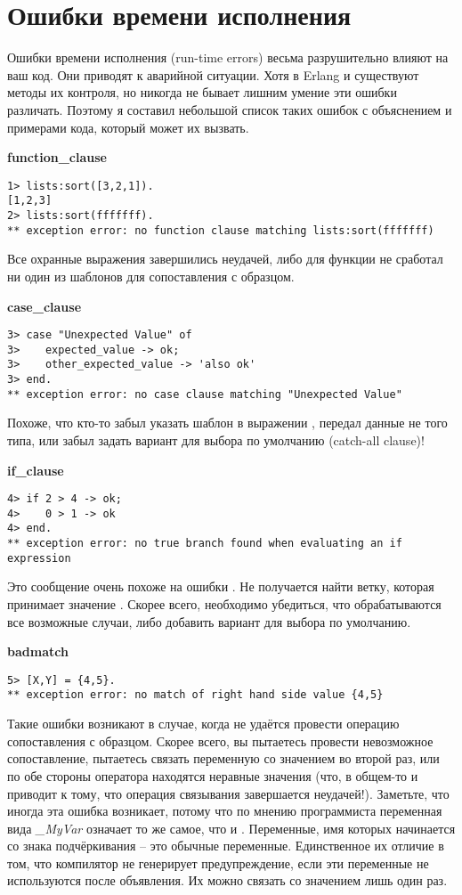 \section{Ошибки времени исполнения}
\label{run-time-errors}
Ошибки времени исполнения (run\--time errors) весьма разрушительно влияют на ваш код. Они приводят к аварийной ситуации.
Хотя в Erlang и существуют методы их контроля, но никогда не бывает лишним умение эти ошибки различать.
Поэтому я составил небольшой список таких ошибок с объяснением и примерами кода, который может их вызвать.

\textbf{function\_clause}
\begin{lstlisting}[style=erlang]
1> lists:sort([3,2,1]).
[1,2,3]
2> lists:sort(fffffff).
** exception error: no function clause matching lists:sort(fffffff)
\end{lstlisting}

Все охранные выражения завершились неудачей, либо для функции не сработал ни один из шаблонов для сопоставления с образцом.
\blankline

\textbf{case\_clause}
\begin{lstlisting}[style=erlang]
3> case "Unexpected Value" of
3>    expected_value -> ok;
3>    other_expected_value -> 'also ok'
3> end.
** exception error: no case clause matching "Unexpected Value"
\end{lstlisting}

Похоже, что кто\--то забыл указать шаблон в выражении , передал данные не того типа, или забыл задать вариант для выбора по умолчанию (catch\--all clause)!
\blankline

\textbf{if\_clause}
\begin{lstlisting}[style=erlang]
4> if 2 > 4 -> ok;
4>    0 > 1 -> ok
4> end.
** exception error: no true branch found when evaluating an if expression
\end{lstlisting}

Это сообщение очень похоже на ошибки . Не получается найти ветку, которая принимает значение .
Скорее всего, необходимо убедиться, что обрабатываются все возможные случаи, либо добавить вариант  для выбора по умолчанию.
\blankline

\textbf{badmatch}
\begin{lstlisting}[style=erlang]
5> [X,Y] = {4,5}.
** exception error: no match of right hand side value {4,5}
\end{lstlisting}

Такие ошибки возникают в случае, когда не удаётся провести операцию сопоставления с образцом.
Скорее всего, вы пытаетесь провести невозможное сопоставление, пытаетесь связать переменную со значением во второй раз, или по обе стороны оператора \ops{\strut=} находятся неравные значения (что, в общем\--то и приводит к тому, что операция связывания завершается неудачей!).
Заметьте, что иногда эта ошибка возникает, потому что по мнению программиста переменная вида \emph{\_MyVar} означает то же самое, что и \ops{\strut\_}.
Переменные, имя которых начинается со знака подчёркивания \--- это обычные переменные.
Единственное их отличие в том, что компилятор не генерирует предупреждение, если эти переменные не используются после объявления.
Их можно связать со значением лишь один раз.
\blankline

